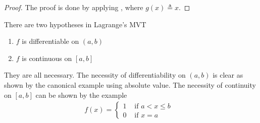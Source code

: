 \documentclass{report}
\begin{document}
\begin{proof}
The proof is done by applying , where $g(x)\triangleq x$.
\end{proof}
\begin{mdframed}
There are two hypotheses in Lagrange's MVT 
\begin{enumerate}[label=(\alph*)]
  \item $f$ is differentiable on $(a,b)$ 
  \item $f$ is continuous on $[a,b]$
\end{enumerate}
They are all necessary. The necessity of differentiability on $(a,b)$ is clear as shown by the canonical example using absolute value. The necessity of continuity on $[a,b]$ can be shown by the example 
\begin{align*}
f(x)=\begin{cases}
  1& \text{ if $a<x\leq b$ }\\
  0& \text{ if  }x=a
\end{cases}
\end{align*}
\end{mdframed}
\end{document}
